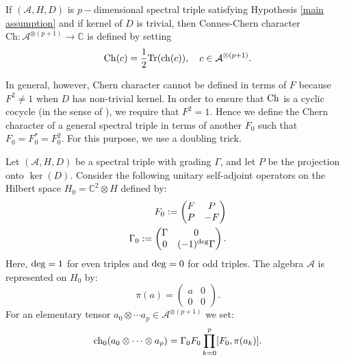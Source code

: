     \begin{defi}\label{chern character zero kernel def}
        If $(\mathcal{A},H,D)$ is $p-$dimensional spectral triple satisfying Hypothesis \ref{main assumption} and if kernel of $D$ is trivial, then Connes-Chern character $\mathrm{Ch}:\mathcal{A}^{\otimes (p+1)}\to\mathbb{C}$ is defined by setting
        \begin{equation*}
            {\rm Ch}(c)=\frac12{\rm Tr}({\rm ch}(c)),\quad c\in\mathcal{A}^{\otimes (p+1)}.
        \end{equation*}
    \end{defi}
    
    In general, however, Chern character cannot be defined in terms of $F$ because $F^2\neq 1$ when $D$ has non-trivial kernel. 
    In order to ensure that ${\rm Ch}$ is a cyclic cocycle (in the sense of \cite[2.1.4]{Loday-cyclic-homology}), we require that $F^2 = 1$.
    Hence we define the Chern character of a general spectral triple in terms of another $F_0$ such that $F_0=F_0^*=F_0^2.$ For this purpose, we use a doubling trick.
    
    \begin{defi}\label{doubling definition}
        Let $(\mathcal{A},H,D)$ be a spectral triple with grading $\Gamma$, and let $P$ be the projection onto $\ker(D)$. Consider the following unitary self-adjoint operators on the Hilbert space $H_0=\mathbb{C}^2\otimes H$ defined by:
        \begin{align*}
                F_0 := \begin{pmatrix} F & P \\ P & -F\end{pmatrix}\\
            \Gamma_0 := \begin{pmatrix} \Gamma & 0 \\ 0 & (-1)^{\rm deg}\Gamma\end{pmatrix}.
        \end{align*}
        Here, ${\rm deg}=1$ for even triples and ${\rm deg}=0$ for odd triples. The algebra $\mathcal{A}$ is represented on $H_0$ by:
        \begin{equation*}
            \pi(a) = \begin{pmatrix}
                        a & 0 \\ 0 & 0
                     \end{pmatrix}.
        \end{equation*}
        For an elementary tensor $a_0\otimes\cdots a_p \in \mathcal{A}^{\otimes (p+1)}$ we set:
        \begin{equation*}
            {\rm ch}_0(a_0\otimes \cdots\otimes a_p) = \Gamma_0F_0\prod_{k=0}^p [F_0,\pi(a_k)].
        \end{equation*}
    \end{defi}
    

